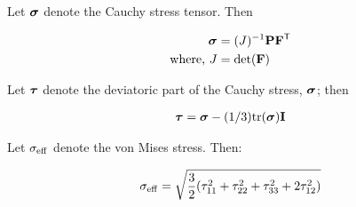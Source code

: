 \documentclass[../main.tex]{subfiles}
\begin{document}
Let $\bm{\sigma}$ denote the Cauchy stress tensor. Then

\begin{align}
    \bm{\sigma} &= (J)^{-1} \mathbf{P} \mathbf{F}^{\sf {T}} \\
    \text{where, } J &= \rm{det}(\mathbf{F}) 
\end{align}




Let $\bm{\tau}$ denote the deviatoric part of the Cauchy stress, $\bm{\sigma}$; then

\begin{align}
    \bm{\tau} &= \bm{\sigma} - (1/3)\rm{tr}(\bm{\sigma})\mathbf{I} \\
\end{align}


Let $\sigma_{\rm{eff}}$ denote the von Mises stress. Then:

\begin{align}
    \sigma_{\rm{eff}} = \sqrt{\frac{3}{2}{(\tau^2_{11} + \tau^2_{22} + \tau^2_{33}} + 2\tau^2_{12})}
\end{align}

\end{document}

